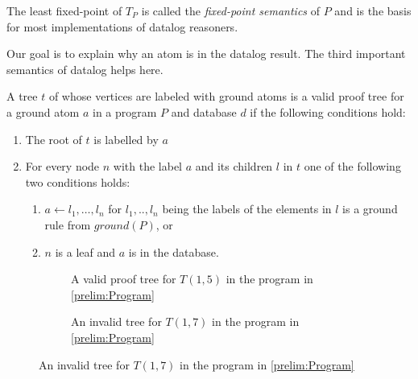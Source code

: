 The least fixed-point of $T_P$ is called the \textit{fixed-point semantics} of $P$ and is the basis for most implementations of datalog reasoners. 

Our goal is to explain why an atom is in the datalog result. The third important semantics of datalog helps here. 

A tree $t$ of whose vertices are labeled with ground atoms is a valid proof tree for a ground atom $a$ in a program $P$ and database $d$ if the following conditions hold:

\begin{enumerate}
    \item The root of $t$ is labelled by $a$
    \item For every node $n$ with the label $a$ and its children $l$ in $t$ one of the following two conditions holds: 
    \begin{enumerate}
        \item $a \leftarrow l_1, \dots ,l_n$ for $l_1,.., l_n$ being the labels of the elements in $l$ is a ground rule from $ground(P)$, or
        \item $n$ is a leaf and $a$ is in the database.
    \end{enumerate}
\end{enumerate}

\begin{figure}[H]
    \centering
    \begin{subfigure}[b]{0.45\linewidth}
    \caption{A valid proof tree for $T(1,5)$ in the program in \cref{prelim:Program}}
    \label{prelim:validTree}
    \end{subfigure}
    \quad
    \begin{subfigure}[b]{0.45\linewidth}
        \caption{An invalid tree for $T(1,7)$ in the program in \cref{prelim:Program}}
        \label{prelim:invalidTree}
    \end{subfigure}
    \end{figure}

